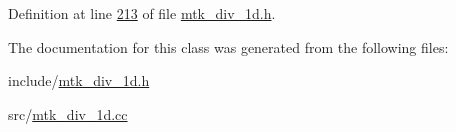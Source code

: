 Definition at line \hyperlink{mtk__div__1d_8h_source_l00213}{213} of file \hyperlink{mtk__div__1d_8h_source}{mtk\+\_\+div\+\_\+1d.\+h}.



The documentation for this class was generated from the following files\+:\begin{DoxyCompactItemize}
\item 
include/\hyperlink{mtk__div__1d_8h}{mtk\+\_\+div\+\_\+1d.\+h}\item 
src/\hyperlink{mtk__div__1d_8cc}{mtk\+\_\+div\+\_\+1d.\+cc}\end{DoxyCompactItemize}

